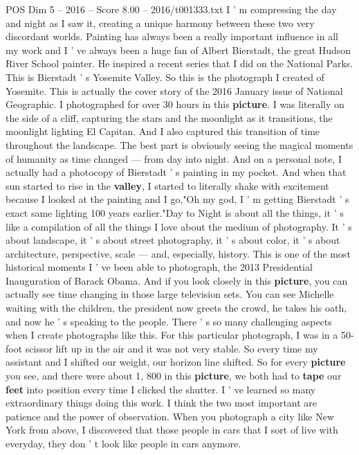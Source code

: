 \begin{textsample}{POS Dim 5 – 2016 – Score 8.00 – 2016/t001333.txt}
I ' m compressing the day and night as I saw it, creating a unique harmony between these two very discordant worlds.
Painting has always been a really important influence in all my work and I ' ve always been a huge fan of Albert Bierstadt, the great Hudson River School painter.
He inspired a recent series that I did on the National Parks.
This is Bierstadt ' s Yosemite Valley.
So this is the photograph I created of Yosemite.
This is actually the cover story of the 2016 January issue of National Geographic.
I photographed for over 30 hours in this \textbf{picture}.
I was literally on the side of a cliff, capturing the stars and the moonlight as it transitions, the moonlight lighting El Capitan.
And I also captured this transition of time throughout the landscape.
The best part is obviously seeing the magical moments of humanity as time changed — from day into night.
And on a personal note, I actually had a photocopy of Bierstadt ' s painting in my pocket.
And when that sun started to rise in the \textbf{valley}, I started to literally shake with excitement because I looked at the painting and I go,"Oh my god, I ' m getting Bierstadt ' s exact same lighting 100 years earlier."Day to Night is about all the things, it ' s like a compilation of all the things I love about the medium of photography.
It ' s about landscape, it ' s about street photography, it ' s about color, it ' s about architecture, perspective, scale — and, especially, history.
This is one of the most historical moments I ' ve been able to photograph, the 2013 Presidential Inauguration of Barack Obama.
And if you look closely in this \textbf{picture}, you can actually see time changing in those large television sets.
You can see Michelle waiting with the children, the president now greets the crowd, he takes his oath, and now he ' s speaking to the people.
There ' s so many challenging aspects when I create photographs like this.
For this particular photograph, I was in a 50-foot scissor lift up in the air and it was not very stable.
So every time my assistant and I shifted our weight, our horizon line shifted.
So for every \textbf{picture} you see, and there were about 1, 800 in this \textbf{picture}, we both had to \textbf{tape} our \textbf{feet} into position every time I clicked the shutter.
I ' ve learned so many extraordinary things doing this work.
I think the two most important are patience and the power of observation.
When you photograph a city like New York from above, I discovered that those people in cars that I sort of live with everyday, they don ' t look like people in cars anymore.

\end{textsample}
